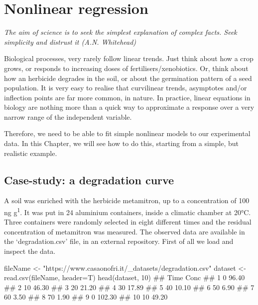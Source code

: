 \documentclass[a4paper,12pt,oneside]{book}
\newenvironment{Shaded}{\begin{snugshade}}{\end{snugshade}}
\newcommand{\DecValTok}[1]{#1}
\newcommand{\StringTok}[1]{#1}
\newcommand{\DocumentationTok}[1]{#1}
\newcommand{\OtherTok}[1]{#1}
\newcommand{\FunctionTok}[1]{#1}
\newcommand{\AttributeTok}[1]{#1}
\newcommand{\NormalTok}[1]{#1}
\begin{document}
\hypertarget{nonlinear-regression}{%
\chapter{Nonlinear regression}\label{nonlinear-regression}}

\emph{The aim of science is to seek the simplest explanation of complex facts. Seek simplicity and distrust it (A.N. Whitehead)}

Biological processes, very rarely follow linear trends. Just think about how a crop grows, or responds to increasing doses of fertilisers/xenobiotics. Or, think about how an herbicide degrades in the soil, or about the germination pattern of a seed population. It is very easy to realise that curvilinear trends, asymptotes and/or inflection points are far more common, in nature. In practice, linear equations in biology are nothing more than a quick way to approximate a response over a very narrow range of the independent variable.

Therefore, we need to be able to fit simple nonlinear models to our experimental data. In this Chapter, we will see how to do this, starting from a simple, but realistic example.

\hypertarget{case-study-a-degradation-curve}{%
\section{Case-study: a degradation curve}\label{case-study-a-degradation-curve}}

A soil was enriched with the herbicide metamitron, up to a concentration of 100 ng g\textsuperscript{1}. It was put in 24 aluminium containers, inside a climatic chamber at 20°C. Three containers were randomly selected in eight different times and the residual concentration of metamitron was measured. The observed data are available in the `degradation.csv' file, in an external repository. First of all we load and inspect the data.

\vspace{12pt}

\begin{Shaded}
\begin{Highlighting}[]
\NormalTok{fileName }\OtherTok{\textless{}{-}} \StringTok{"https://www.casaonofri.it/\_datasets/degradation.csv"}
\NormalTok{dataset }\OtherTok{\textless{}{-}} \FunctionTok{read.csv}\NormalTok{(fileName, }\AttributeTok{header=}\NormalTok{T)}
\FunctionTok{head}\NormalTok{(dataset, }\DecValTok{10}\NormalTok{)}
\DocumentationTok{\#\#    Time   Conc}
\DocumentationTok{\#\# 1     0  96.40}
\DocumentationTok{\#\# 2    10  46.30}
\DocumentationTok{\#\# 3    20  21.20}
\DocumentationTok{\#\# 4    30  17.89}
\DocumentationTok{\#\# 5    40  10.10}
\DocumentationTok{\#\# 6    50   6.90}
\DocumentationTok{\#\# 7    60   3.50}
\DocumentationTok{\#\# 8    70   1.90}
\DocumentationTok{\#\# 9     0 102.30}
\DocumentationTok{\#\# 10   10  49.20}
\end{Highlighting}
\end{Shaded}
\end{document}
